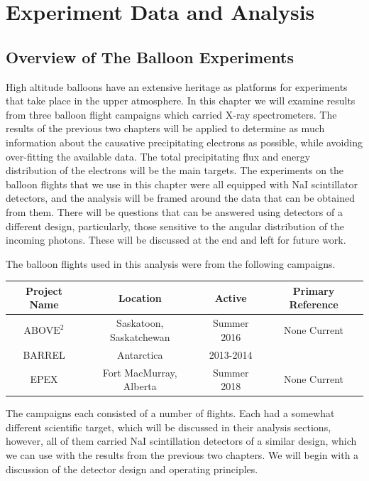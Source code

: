 \chapter{Experiment Data and Analysis}

\section{Overview of The Balloon Experiments}

High altitude balloons have an extensive heritage as platforms for experiments that take place in the upper atmosphere. In this chapter we will examine results from three balloon flight campaigns which carried X-ray spectrometers. The results of the previous two chapters will be applied to determine as much information about the causative precipitating electrons as possible, while avoiding over-fitting the available data. The total precipitating flux and energy distribution of the electrons will be the main targets. The experiments on the balloon flights that we use in this chapter were all equipped with NaI scintillator detectors, and the analysis will be framed around the data that can be obtained from them. There will be questions that can be answered using detectors of a different design, particularly, those sensitive to the angular distribution of the incoming photons. These will be discussed at the end and left for future work. 

The balloon flights used in this analysis were from the following campaigns.

\begin{center}
\begin{tabular}{ |c|c|c|c| } 
\hline
Project Name & Location & Active & Primary Reference \\
\hline
$\text{ABOVE}^2$ & Saskatoon, Saskatchewan & Summer 2016 & None Current\\
\hline
BARREL & Antarctica & 2013-2014 & \citet{Millan2014}\\
\hline
EPEX & Fort MacMurray, Alberta & Summer 2018 & None Current\\
\hline
\end{tabular}
\end{center}

The campaigns each consisted of a number of flights. Each had a somewhat different scientific target, which will be discussed in their analysis sections, however, all of them carried NaI scintillation detectors of a similar design, which we can use with the results from the previous two chapters. We will begin with a discussion of the detector design and operating principles. 

